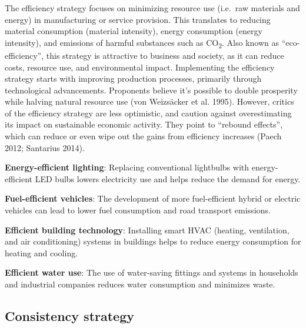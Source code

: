 \documentclass[
  a4paper,
  DIV=11,
  numbers=noendperiod,
  oneside,
  openany]{scrreprt}
\begin{document}
The efficiency strategy focuses on minimizing resource use (i.e.~raw
materials and energy) in manufacturing or service provision. This
translates to reducing material consumption (material intensity), energy
consumption (energy intensity), and emissions of harmful substances such
as CO\textsubscript{2}. Also known as ``eco-efficiency'', this strategy
is attractive to business and society, as it can reduce costs, resource
use, and environmental impact. Implementing the efficiency strategy
starts with improving production processes, primarily through
technological advancements. Proponents believe it's possible to double
prosperity while halving natural resource use ({von Weizsäcker et al.}
1995). However, critics of the efficiency strategy are less optimistic,
and caution against overestimating its impact on sustainable economic
activity. They point to ``rebound effects'', which can reduce or even
wipe out the gains from efficiency increases (Paech 2012; Santarius
2014).

\begin{tcolorbox}[enhanced jigsaw, arc=.35mm, bottomrule=.15mm, bottomtitle=1mm, breakable, colback=white, colbacktitle=quarto-callout-tip-color!10!white, colframe=quarto-callout-tip-color-frame, coltitle=black, left=2mm, leftrule=.75mm, opacityback=0, opacitybacktitle=0.6, rightrule=.15mm, title={Putting Efficiency Strategies into Action: Examples}, titlerule=0mm, toprule=.15mm, toptitle=1mm]

\textbf{Energy-efficient lighting}: Replacing conventional lightbulbs
with energy-efficient LED bulbs lowers electricity use and helps reduce
the demand for energy.

\textbf{Fuel-efficient vehicles}: The development of more fuel-efficient
hybrid or electric vehicles can lead to lower fuel consumption and road
transport emissions.

\textbf{Efficient building technology}: Installing smart HVAC (heating,
ventilation, and air conditioning) systems in buildings helps to reduce
energy consumption for heating and cooling.

\textbf{Efficient water use}: The use of water-saving fittings and
systems in households and industrial companies reduces water consumption
and minimizes waste.

\end{tcolorbox}

\subsection{Consistency strategy}\label{consistency-strategy}
\end{document}
